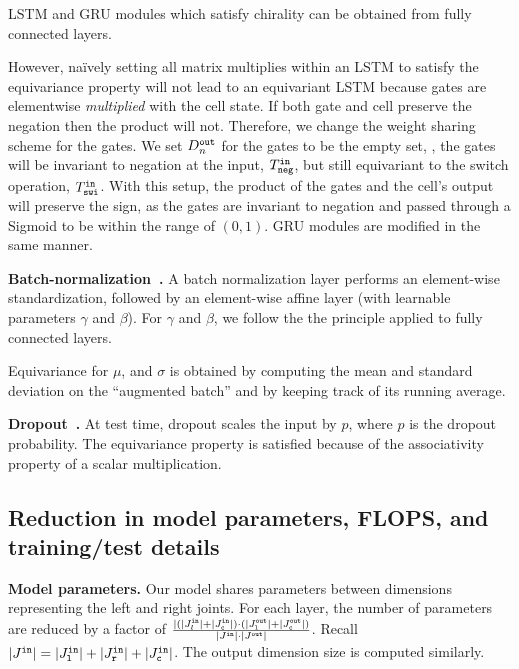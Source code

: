 \documentclass{article}
\begin{document}
LSTM and GRU modules which satisfy chirality can be obtained from fully connected layers. 

However, na\"ively setting all matrix multiplies within an LSTM to satisfy the equivariance property will not lead to an equivariant LSTM because gates are elementwise \textit{multiplied} with the cell state. If both  gate and cell  preserve the negation then the product will not. Therefore, we  change the weight sharing scheme for the gates. We set $D_{n}^{\tt out}$ for the gates to be the empty set, \ie,  the gates will be invariant to negation at the input, $T^{\tt in}_{\tt neg}$, but still equivariant to the switch operation, $T^{\tt in}_{\tt swi}$. With this setup, the product of the gates and the cell's output will preserve the sign, as the gates are invariant to negation and passed through a Sigmoid to be within the range of $(0,1)$.  GRU modules are modified  in the same manner. 



\textbf{Batch-normalization~\cite{ioffe2015batch}.}
A batch normalization layer performs an element-wise standardization, followed by an element-wise affine layer (with learnable parameters $\gamma$ and $\beta$).
For $\gamma$ and $\beta$, we follow the 
the principle applied to fully connected layers. 

Equivariance for $\mu$, and $\sigma$ is obtained by
computing the mean and standard deviation on the ``augmented batch'' and by keeping track of its running average. 

\textbf{Dropout~\cite{srivastava2014dropout}.}
At test time, dropout scales the input by $p$, where $p$ is the dropout probability. The equivariance property is satisfied because of  the associativity property of a scalar multiplication. 

\subsection{Reduction in model parameters, FLOPS, and training/test details}
\textbf{Model parameters.} Our model shares parameters between dimensions representing the left and right joints. For each layer, the number of parameters are reduced by a factor of 
$\frac{|(|J_{l}^{\tt in}| + |J_{\tt c}^{\tt in}|) \cdot (|J_{\tt l}^{\tt out}| + |J_{\tt c}^{\tt out}|)}{|J^{\tt in}|\cdot |J^{\tt out}|}$. Recall $|J^{\tt in}| = |J_{\tt l}^{\tt in}| + |J_{\tt r}^{\tt in}| + |J_{\tt c}^{\tt in}|$. The output dimension size is computed similarly.
\end{document}
